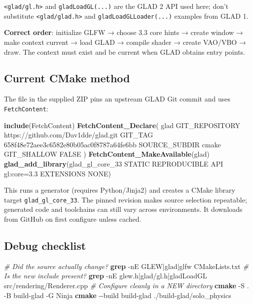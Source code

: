 \documentclass[
  10pt,
  a4paper,
]{article}
\newenvironment{Shaded}{\begin{snugshade}}{\end{snugshade}}
\newcommand{\AttributeTok}[1]{\textcolor[rgb]{0.13,0.29,0.53}{#1}}
\newcommand{\CommentTok}[1]{\textcolor[rgb]{0.56,0.35,0.01}{\textit{#1}}}
\newcommand{\DataTypeTok}[1]{\textcolor[rgb]{0.13,0.29,0.53}{#1}}
\newcommand{\ExtensionTok}[1]{#1}
\newcommand{\FunctionTok}[1]{\textcolor[rgb]{0.13,0.29,0.53}{\textbf{#1}}}
\newcommand{\ImportTok}[1]{#1}
\newcommand{\KeywordTok}[1]{\textcolor[rgb]{0.13,0.29,0.53}{\textbf{#1}}}
\newcommand{\NormalTok}[1]{#1}
\newcommand{\OtherTok}[1]{\textcolor[rgb]{0.56,0.35,0.01}{#1}}
\newcommand{\StringTok}[1]{\textcolor[rgb]{0.31,0.60,0.02}{#1}}
\begin{document}
\texttt{\textless{}glad/gl.h\textgreater{}} and \texttt{gladLoadGL(...)}
are the GLAD 2 API used here; don't substitute
\texttt{\textless{}glad/glad.h\textgreater{}} and
\texttt{gladLoadGLLoader(...)} examples from GLAD 1.

\textbf{Correct order}: initialize GLFW → choose 3.3 core hints → create
window → make context current → load GLAD → compile shader → create
VAO/VBO → draw. The context must exist and be current when GLAD obtains
entry points.

\subsection{Current CMake method}\label{current-cmake-method}

The file in the supplied ZIP pins an upstream GLAD Git commit and uses
\texttt{FetchContent}:

\begin{Shaded}
\begin{Highlighting}[]
\KeywordTok{include}\NormalTok{(}\ImportTok{FetchContent}\NormalTok{)}
\FunctionTok{FetchContent\_Declare}\NormalTok{(}
\NormalTok{    glad}
    \OtherTok{GIT\_REPOSITORY}\NormalTok{ https://github.com/Dav1dde/glad.git}
    \OtherTok{GIT\_TAG}\NormalTok{ 658f48e72aee3c6582e80b05ac0f8787a64fe6bb}
    \OtherTok{SOURCE\_SUBDIR}\NormalTok{ cmake}
    \OtherTok{GIT\_SHALLOW} \OtherTok{FALSE}
\NormalTok{)}
\FunctionTok{FetchContent\_MakeAvailable}\NormalTok{(glad)}
\FunctionTok{glad\_add\_library}\NormalTok{(glad\_gl\_core\_33 STATIC REPRODUCIBLE API gl:core=}\DataTypeTok{3.3}\NormalTok{ EXTENSIONS NONE)}
\end{Highlighting}
\end{Shaded}

This runs a generator (requires Python/Jinja2) and creates a CMake
library target \texttt{glad\_gl\_core\_33}. The pinned revision makes
source selection repeatable; generated code and toolchains can still
vary across environments. It downloads from GitHub on first configure
unless cached.

\subsection{Debug checklist}\label{debug-checklist}

\begin{Shaded}
\begin{Highlighting}[]
\CommentTok{\# Did the source actually change?}
\FunctionTok{grep} \AttributeTok{{-}nE} \StringTok{\textquotesingle{}GLEW|glad|glfw\textquotesingle{}}\NormalTok{ CMakeLists.txt}
\CommentTok{\# Is the new include present?}
\FunctionTok{grep} \AttributeTok{{-}nE} \StringTok{\textquotesingle{}glew.h|glad/gl.h|gladLoadGL\textquotesingle{}}\NormalTok{ src/rendering/Renderer.cpp}
\CommentTok{\# Configure cleanly in a NEW directory}
\FunctionTok{cmake} \AttributeTok{{-}S}\NormalTok{ . }\AttributeTok{{-}B}\NormalTok{ build{-}glad }\AttributeTok{{-}G}\NormalTok{ Ninja}
\FunctionTok{cmake} \AttributeTok{{-}{-}build}\NormalTok{ build{-}glad}
\ExtensionTok{./build{-}glad/solo\_physics}
\end{Highlighting}
\end{Shaded}
\end{document}
